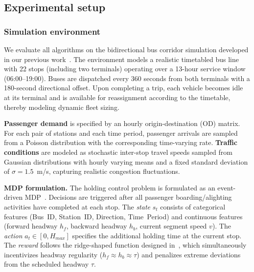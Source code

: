 \documentclass[10pt]{article}
\begin{document}
\subsection{Experimental setup}

\subsubsection{Simulation environment}
We evaluate all algorithms on the bidirectional bus corridor simulation developed in our previous work~\cite{Zhang2025SingleAgentBus}. The environment models a realistic timetabled bus line with 22 stops (including two terminals) operating over a 13-hour service window (06:00--19:00). Buses are dispatched every 360 seconds from both terminals with a 180-second directional offset. Upon completing a trip, each vehicle becomes idle at its terminal and is available for reassignment according to the timetable, thereby modeling dynamic fleet sizing.

\textbf{Passenger demand} is specified by an hourly origin-destination (OD) matrix. For each pair of stations and each time period, passenger arrivals are sampled from a Poisson distribution with the corresponding time-varying rate. \textbf{Traffic conditions} are modeled as stochastic inter-stop travel speeds sampled from Gaussian distributions with hourly varying means and a fixed standard deviation of $\sigma = 1.5$~m/s, capturing realistic congestion fluctuations.

\textbf{MDP formulation.} The holding control problem is formulated as an event-driven MDP~\cite{Zhang2025SingleAgentBus}. Decisions are triggered after all passenger boarding/alighting activities have completed at each stop. The \textit{state} $s_t$ consists of categorical features (Bus~ID, Station~ID, Direction, Time~Period) and continuous features (forward headway $h_f$, backward headway $h_b$, current segment speed $v$). The \textit{action} $a_t \in [0, H_{max}]$ specifies the additional holding time at the current stop. The \textit{reward} follows the ridge-shaped function designed in~\cite{Zhang2025SingleAgentBus}, which simultaneously incentivizes headway regularity ($h_f \approx h_b \approx \tau$) and penalizes extreme deviations from the scheduled headway $\tau$.
\end{document}
